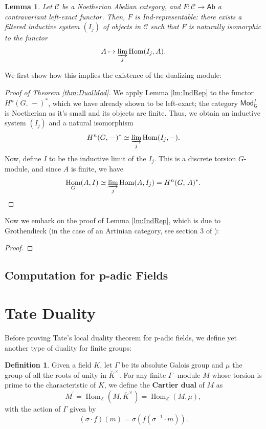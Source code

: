 \documentclass[a4paper]{report}
\def\Z{\mathbb{Z}}
\def\K{K}
\def\Kx{\overline{\K}^\times}
\def\Gfmod{\mathsf{Mod}_{\mathsf{G}}^f}
\def\Ab{\mathsf{Ab}}
\renewcommand{\H}[3]{H^{#1}( #2, \, #3 )}
\DeclareMathOperator{\Hom}{Hom}
\theoremstyle{plain}
\newtheorem{lemma}[theorem]{Lemma}
\theoremstyle{definition}
\newtheorem{definition}[theorem]{Definition}
\theoremstyle{remark}
\begin{document}
\begin{lemma}\label{lm:IndRep}
    Let \(\mathcal{C}\) be a Noetherian Abelian category, and \(F: \mathcal{C}\to\Ab\) a contravariant left-exact functor.
    Then, \(F\) is \textup{Ind}-representable: there exists a filtered inductive system \((I_j)\) of objects in \(\mathcal{C}\) such that \(F\) is naturally isomorphic to the functor
    \[A\mapsto \varinjlim_j \Hom(I_j,A).\]
\end{lemma}

We first show how this implies the existence of the dualizing module:

\begin{proof}[Proof of Theorem \eqref{thm:DualMod}]
    We apply Lemma \eqref{lm:IndRep} to the functor \(\H{n}{G}{-}^*\), which we have already shown to be left-exact; the category \(\Gfmod\) is Noetherian as it's small and its objects are finite.
    Thus, we obtain an inductive system \((I_j)\) and a natural isomorphism
    \[
        \H{n}{G}{-}^* \simeq \varinjlim_j \Hom(I_j,-).
    \]
    Now, define \(I\) to be the inductive limit of the \(I_j\). This is a discrete torsion \(G\)-module, and since \(A\) is finite, we have
    \[
        \Hom_G(A,I) \simeq \varinjlim_j \Hom(A,I_j) = \H{n}{G}{A}^*.
    \]
\end{proof}

Now we embark on the proof of Lemma \eqref{lm:IndRep}, which is
due to Grothendieck (in the case of an Artinian category, see section 3 of \cite{Grothendieck}):

\begin{proof}

\end{proof}

\subsection{Computation for p-adic Fields}

\section{Tate Duality}

Before proving Tate's local duality theorem for p-adic fields, we define
yet another type of duality for finite groups:

\begin{definition}
    Given a field \(\K\), let  $\Gamma$ be its absolute Galois group and $\mu$ the group of all the roots of unity in $\Kx$.
    For any finite \(\Gamma\) -module \(M\) whose torsion is prime to the characteristic of \(\K\),
    we define the \textbf{Cartier dual} of $M$ as
    \begin{equation*}
        M^{\prime} = \Hom_{\Z}(M, \Kx)=\Hom_{\Z}(M, \mu),
    \end{equation*}
    with the action of $\Gamma$ given by
    \begin{equation*}
        (\sigma \cdot f)(m) = \sigma(f(\sigma^{-1}\cdot m)).
    \end{equation*}
\end{definition}
\end{document}

